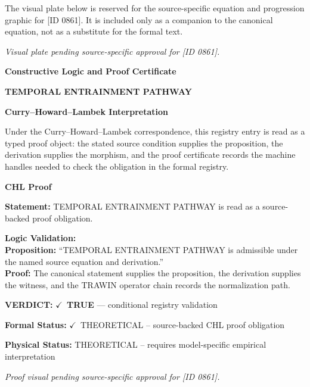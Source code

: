 \begingroup\footnotesize\sloppy
The visual plate below is reserved for the source-specific equation and progression graphic for [ID 0861]. It is included only as a companion to the canonical equation, not as a substitute for the formal text.
\par\endgroup
\begingroup\footnotesize\itshape
Visual plate pending source-specific approval for [ID 0861].
\par\endgroup

\clearpage
\begingroup\tzpsupportsetup
\noindent\textbf{\fontsize{10.8pt}{12.8pt}\selectfont [ID 0861] Constructive Logic and Proof Certificate}\par
\noindent\textbf{\fontsize{10pt}{12pt}\selectfont TEMPORAL ENTRAINMENT PATHWAY}\par
\vspace{0.45em}
\begingroup
\footnotesize
\setlength{\parskip}{0.22em}
\setlength{\parindent}{0pt}
\noindent\textbf{Curry--Howard--Lambek Interpretation}\par
Under the Curry--Howard--Lambek correspondence, this registry entry is read as a typed proof
object: the stated source condition supplies the proposition, the derivation supplies the
morphism, and the proof certificate records the machine handles needed to check the obligation
in the formal registry.

\vspace{0.45em}
\noindent\textbf{CHL Proof}\par
\textbf{Statement:} TEMPORAL ENTRAINMENT PATHWAY is read as a source-backed proof obligation.

\textbf{Logic Validation:}\\
\textbf{Proposition:} ``TEMPORAL ENTRAINMENT PATHWAY is admissible under the named source equation and derivation.''\\
\textbf{Proof:} The canonical statement supplies the proposition, the derivation supplies the witness, and the TRAWIN operator chain records the normalization path.

\textbf{VERDICT:} \ensuremath{\checkmark}\ \textbf{TRUE} --- conditional registry validation

\textbf{Formal Status:} \ensuremath{\checkmark}\ THEORETICAL -- source-backed CHL proof obligation

\textbf{Physical Status:} THEORETICAL -- requires model-specific empirical interpretation
\par\vspace{0.45em}
\par
\vfill
\begingroup\footnotesize\itshape
Proof visual pending source-specific approval for [ID 0861].
\par\endgroup
\vfill
\endgroup
\endgroup
